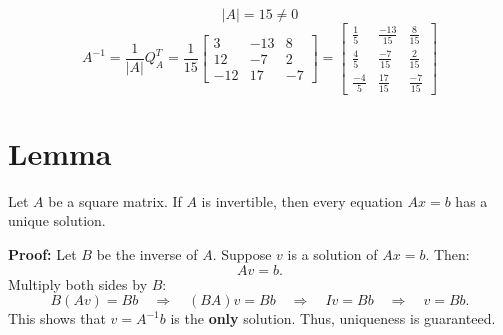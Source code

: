 \documentclass{article}
\begin{document}
\[
|A| = 15 \neq 0
\]
\[
A^{-1} = \frac{1}{|A|}Q_A^T 
= \frac{1}{15}\begin{bmatrix}
        3 & -13 & 8 \\
        12 & -7 & 2 \\
        -12 & 17 & -7
\end{bmatrix}
= \begin{bmatrix}
        \frac{1}{5} & \frac{-13}{15} & \frac{8}{15} \\[6pt]
        \frac{4}{5} & \frac{-7}{15} & \frac{2}{15} \\[6pt]
        \frac{-4}{5} & \frac{17}{15} & \frac{-7}{15}
\end{bmatrix}
\]

\section*{Lemma}  
Let \( A \) be a square matrix. If \( A \) is invertible, then every equation \( Ax = b \) has a unique solution.  

\textbf{Proof:}  
Let \( B \) be the inverse of \( A \). Suppose \( v \) is a solution of \( Ax = b \). Then:  
\[
Av = b.
\]  
Multiply both sides by \( B \):  
\[
B(Av) = Bb \quad \Rightarrow \quad (BA)v = Bb \quad \Rightarrow \quad Iv = Bb \quad \Rightarrow \quad v = Bb.
\]  
This shows that \( v = A^{-1}b \) is the \textbf{only} solution. Thus, uniqueness is guaranteed.  
\end{document}
